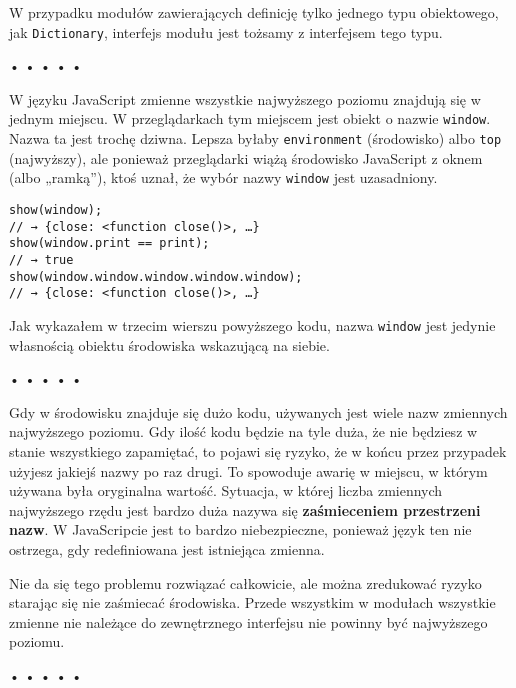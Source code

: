   
W przypadku modułów zawierających definicję tylko jednego typu obiektowego, jak \texttt{Dictionary}, interfejs modułu jest tożsamy z interfejsem tego typu.



\begin{center}
• • • • •
\end{center}

  
W języku JavaScript zmienne wszystkie najwyższego poziomu znajdują się w jednym miejscu. W przeglądarkach tym miejscem jest obiekt o nazwie \texttt{window}. Nazwa ta jest trochę dziwna. Lepsza byłaby \texttt{environment} (środowisko) albo \texttt{top} (najwyższy), ale ponieważ przeglądarki wiążą środowisko JavaScript z oknem (albo „ramką”), ktoś uznał, że wybór nazwy \texttt{window} jest uzasadniony.

  
\begin{verbatim} 
show(window);
// → {close: <function close()>, …}
show(window.print == print);
// → true
show(window.window.window.window.window);
// → {close: <function close()>, …}
\end{verbatim}
  
Jak wykazałem w trzecim wierszu powyższego kodu, nazwa \texttt{window} jest jedynie własnością obiektu środowiska wskazującą na siebie.



\begin{center}
• • • • •
\end{center}

  
Gdy w środowisku znajduje się dużo kodu, używanych jest wiele nazw zmiennych najwyższego poziomu. Gdy ilość kodu będzie na tyle duża, że nie będziesz w stanie wszystkiego zapamiętać, to pojawi się ryzyko, że w końcu przez przypadek użyjesz jakiejś nazwy po raz drugi. To spowoduje awarię w miejscu, w którym używana była oryginalna wartość. Sytuacja, w której liczba zmiennych najwyższego rzędu jest bardzo duża nazywa się \textbf{zaśmieceniem przestrzeni nazw}. W JavaScripcie jest to bardzo niebezpieczne, ponieważ język ten nie ostrzega, gdy redefiniowana jest istniejąca zmienna.

  
Nie da się tego problemu rozwiązać całkowicie, ale można zredukować ryzyko starając się nie zaśmiecać środowiska. Przede wszystkim w modułach wszystkie zmienne nie należące do zewnętrznego interfejsu nie powinny być najwyższego poziomu.



\begin{center}
• • • • •
\end{center}

